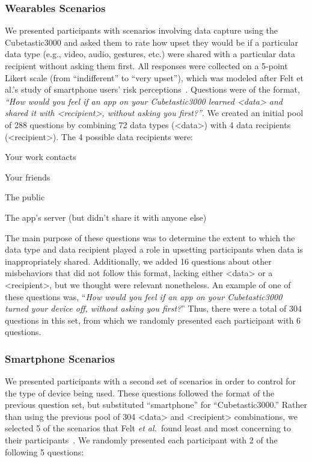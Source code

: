 \documentclass{acm_proc_article-sp}
\def\etal{{\it et al.~}}
\newenvironment{packed_item}{
\begin{itemize}
  \setlength{\itemsep}{1pt}
  \setlength{\parskip}{0pt}
  \setlength{\parsep}{0pt}
}{\end{itemize}}
\begin{document}
\subsubsection{Wearables Scenarios}
We presented participants with scenarios involving data capture using the Cubetastic3000 and asked them to rate how upset they would be if a particular data type (e.g., video, audio, gestures, etc.) were shared with a particular data recipient without asking them first. All responses were collected on a 5-point Likert scale (from ``indifferent'' to ``very upset''), which was modeled after Felt et al.'s study of smartphone users' risk perceptions~\cite{Felt}. Questions were of the format, \textit{``How would you feel if an app on your Cubetastic3000 learned <data> and shared it with <recipient>, without asking you first?''}. We created an initial pool of 288 questions by combining 72 data types (<data>) with 4 data recipients (<recipient>). The 4 possible data recipients were:  \\[-.8cm]

\begin{packed_item}
\item Your work contacts
\item Your friends
\item The public
\item The app's server (but didn't share it with anyone else)
\end{packed_item}

The main purpose of these questions was to determine the extent to which the data type and data recipient played a role in upsetting participants when data is inappropriately shared. Additionally, we added 16 questions about other misbehaviors that did not follow this format, lacking either <data> or a <recipient>, but we thought were relevant nonetheless. An example of one of these questions was, ``\textit{How would you feel if an app on your Cubetastic3000 turned your device off, without asking you first?}'' Thus, there were a total of 304 questions in this set, from which we randomly presented each participant with 6 questions.

\subsubsection{Smartphone Scenarios}
\label{sec:smartphones}
We presented participants with a second set of scenarios in order to control for the type of device being used. These questions followed the format of the previous question set, but substituted ``smartphone'' for ``Cubetastic3000.'' Rather than using the previous pool of 304 <data> and <recipient> combinations, we selected 5 of the scenarios that Felt \etal found least and most concerning to their participants~\cite{Felt}. We randomly presented each participant with 2 of the following 5 questions: \\[-.8cm]
\end{document}
